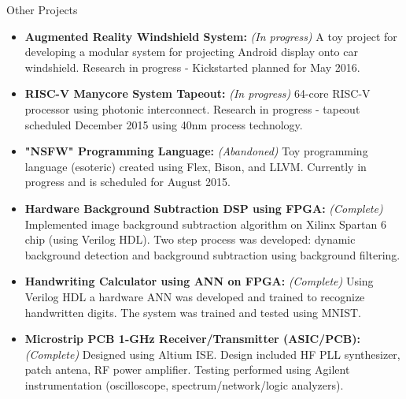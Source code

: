 \begin{rSection}{Other Projects}
  \begin{itemize}
  \item {\bf Augmented Reality Windshield System: } {\it (In progress)} A toy project for developing a modular system for projecting Android display onto car windshield. Research in progress - Kickstarted planned for May 2016.
  \item {\bf RISC-V Manycore System Tapeout:} {\it (In progress)} 64-core RISC-V processor using photonic interconnect. Research in progress - tapeout scheduled December 2015 using 40nm process technology.
  \item {\bf "NSFW" Programming Language:} {\it (Abandoned)} Toy programming language (esoteric) created using Flex, Bison, and LLVM. Currently in progress and is scheduled for August 2015.
  \item {\bf Hardware Background Subtraction DSP using FPGA:} {\it (Complete)} Implemented image background subtraction algorithm on Xilinx Spartan 6 chip (using Verilog HDL). Two step process was developed: dynamic background detection and background subtraction using background filtering.
  \item {\bf Handwriting Calculator using ANN on FPGA:} {\it (Complete)} Using Verilog HDL a hardware ANN was developed and trained to recognize handwritten digits. The system was trained and tested using MNIST.
  \item {\bf Microstrip PCB 1-GHz Receiver/Transmitter (ASIC/PCB):} {\it (Complete)} Designed using Altium ISE. Design included HF PLL synthesizer, patch antena, RF power amplifier. Testing performed using Agilent instrumentation (oscilloscope, spectrum/network/logic analyzers).
  \end{itemize}
\end{rSection}
